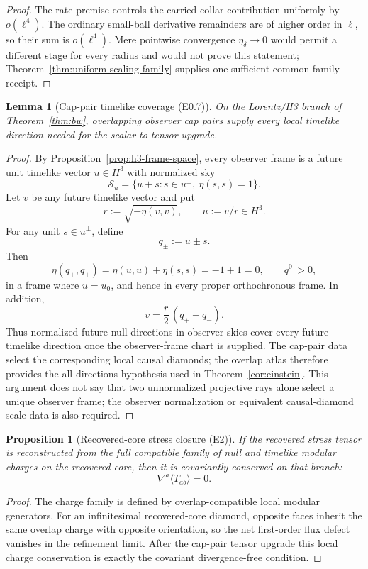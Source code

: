 \documentclass[11pt]{article}
\newtheorem{proposition}[theorem]{Proposition}
\newtheorem{lemma}[theorem]{Lemma}
\begin{document}
\begin{proof}
The rate premise controls the carried collar contribution uniformly by
\(o(\ell^4)\). The ordinary small-ball derivative remainders are of higher
order in \(\ell\), so their sum is \(o(\ell^4)\). Mere pointwise convergence
\(\eta_\delta\to0\) would permit a different stage for every radius and would
not prove this statement; Theorem~\ref{thm:uniform-scaling-family} supplies
one sufficient common-family receipt.
\end{proof}

\begin{lemma}[Cap-pair timelike coverage (E0.7)]\label{lem:cap-pair-timelike-coverage}
On the Lorentz/H3 branch of Theorem~\ref{thm:bw}, overlapping observer cap
pairs supply every local timelike direction needed for the scalar-to-tensor
upgrade.
\end{lemma}

\begin{proof}
By Proposition~\ref{prop:h3-frame-space}, every observer frame is a future
unit timelike vector \(u\in H^3\) with normalized sky
\[
\mathcal S_u=\{u+s:s\in u^\perp,\ \eta(s,s)=1\}.
\]
Let \(v\) be any future timelike vector and put
\[
r:=\sqrt{-\eta(v,v)},\qquad u:=v/r\in H^3.
\]
For any unit \(s\in u^\perp\), define
\[
q_\pm:=u\pm s.
\]
Then
\[
\eta(q_\pm,q_\pm)=\eta(u,u)+\eta(s,s)=-1+1=0,
\qquad
q_\pm^0>0,
\]
in a frame where \(u=u_0\), and hence in every proper orthochronous frame.
In addition,
\[
\boxed{
v=\frac r2\,(q_++q_-).
}
\]
Thus normalized future null directions in observer skies cover every future
timelike direction once the observer-frame chart is supplied. The cap-pair
data select the corresponding local causal diamonds; the overlap atlas
therefore provides the all-directions hypothesis used in
Theorem~\ref{cor:einstein}. This argument does not say that two unnormalized
projective rays alone select a unique observer frame; the observer
normalization or equivalent causal-diamond scale data is also required.
\end{proof}

\begin{proposition}[Recovered-core stress closure (E2)]\label{prop:recovered-core-stress-closure}
If the recovered stress tensor is reconstructed from the full compatible
family of null and timelike modular charges on the recovered core, then it is
covariantly conserved on that branch:
\[
\nabla^a\langle T_{ab}\rangle=0 .
\]
\end{proposition}

\begin{proof}
The charge family is defined by overlap-compatible local modular generators.
For an infinitesimal recovered-core diamond, opposite faces inherit the same
overlap charge with opposite orientation, so the net first-order flux defect
vanishes in the refinement limit.  After the cap-pair tensor upgrade this
local charge conservation is exactly the covariant divergence-free condition.
\end{proof}
\end{document}
